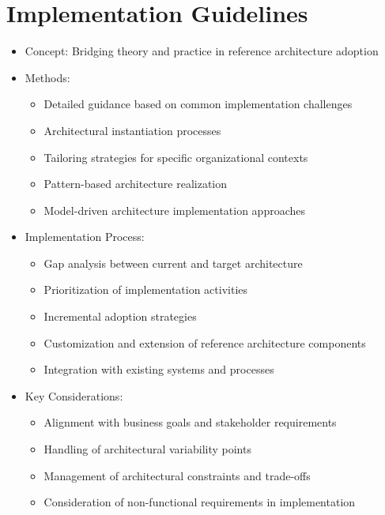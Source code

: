 \documentclass[12pt,a4paper]{article}
\begin{document}
\section{Implementation Guidelines}
\begin{itemize}
    \item Concept: Bridging theory and practice in reference architecture adoption
    \item Methods:
    \begin{itemize}
        \item Detailed guidance based on common implementation challenges \citep{Martínez-Fernández2013}
        \item Architectural instantiation processes \citep{Angelov2012}
        \item Tailoring strategies for specific organizational contexts \citep{Galster2014}
        \item Pattern-based architecture realization \citep{Buschmann2007}
        \item Model-driven architecture implementation approaches \citep{Schmidt2006}
    \end{itemize}
    \item Implementation Process:
    \begin{itemize}
        \item Gap analysis between current and target architecture \citep{Hanschke2010}
        \item Prioritization of implementation activities \citep{Bredemeyer2002}
        \item Incremental adoption strategies \citep{Zimmermann2015}
        \item Customization and extension of reference architecture components \citep{Galster2011}
        \item Integration with existing systems and processes \citep{Lankhorst2017}
    \end{itemize}
    \item Key Considerations:
    \begin{itemize}
        \item Alignment with business goals and stakeholder requirements \citep{Ross2006}
        \item Handling of architectural variability points \citep{Galster2014}
        \item Management of architectural constraints and trade-offs \citep{Bass2003}
        \item Consideration of non-functional requirements in implementation \citep{Chung2012}

\end{itemize}
\end{itemize}
\end{document}
